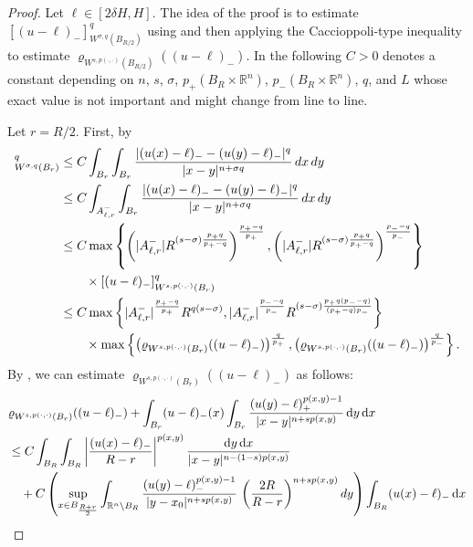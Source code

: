 \documentclass[11pt]{amsart}
\theoremstyle{plain}
\theoremstyle{definition}
\numberwithin{equation}{section}
\renewcommand{\d}{\textnormal{d}}
\newcommand{\R}{\mathbb{R}}
\begin{document}
\begin{proof}
Let $\ell\in[2\delta H,  H]$. The idea of the proof is to estimate $[(u-\ell)_{-}]_{W^{\sigma,q}(B_{R/2})}^q$ using 
and then applying the Caccioppoli-type inequality to estimate $\varrho_{W^{s,p(\cdot,\cdot)}(B_{R/2})}((u-\ell)_-) $. 
In the following $C>0$ denotes a constant depending on $n$, $s$, $\sigma$, $p_{+}(B_R\times\R^n)$, $p_{-}(B_R\times\R^n)$, $q$, and $L$ whose exact value is not important and might change from line to line.

Let $r=R/2$. First, by 
\begin{align*}
[(u-\ell)_{-}]_{W^{\sigma,q}(B_{r})}^q &\leq C\int_{B_{r}}\int_{B_{r}} \frac{|(u(x)-\ell)_{-} - (u(y)-\ell)_{-}|^q}{|x-y|^{n+\sigma q}} \, \d x\, \d y \\
& \leq C\int_{A_{\ell,r}^{-}}\int_{B_{r}} \frac{|(u(x)-\ell)_{-} - (u(y)-\ell)_{-}|^q}{|x-y|^{n+\sigma q}} \, \d x\, \d y \\
& \leq C \max \left\lbrace \left( |A_{\ell,r}^{-}| R^{(s-\sigma) \frac{p_+q }{p_+-q}} \right)^{\frac{p_+-q}{p_+}}, \left( |A_{\ell,r}^{-}| R^{(s-\sigma) \frac{p_+q }{p_+-q}} \right)^{\frac{p_--q}{p_-}} \right \rbrace \\
&\qquad \times [(u-\ell)_{-}]_{W^{s,p(\cdot, \cdot)}(B_{r})}^q \\
& \leq C \max \left\lbrace  |A_{\ell,r}^{-}|^{\frac{p_+-q}{p_+}} R^{q(s-\sigma)} ,  |A_{\ell,r}^{-}|^{\frac{p_--q}{p_-}} R^{(s-\sigma) \frac{p_+ q(p_--q)}{(p_+-q)p_-}} \right \rbrace \\
& \qquad \times \max\left\{ \left(\varrho_{W^{s,p(\cdot,\cdot)}(B_{r})}((u-\ell)_{-})\right)^{\frac{q}{p_{+}}}, \left(\varrho_{W^{s,p(\cdot,\cdot)}(B_{r})}((u-\ell)_{-})\right)^{\frac{q}{p_{-}}} \right\}.
\end{align*}
By , we can estimate $\varrho_{W^{s,p(\cdot,\cdot)}(B_{r})}((u-\ell)_-)$ as follows:
\begin{align*}
&\varrho_{W^{s,p(\cdot,\cdot)}(B_{r})}((u-\ell)_-) + \int_{B_r} (u-\ell)_-(x) \int_{B_r} \frac{(u(y)-\ell)_+^{p(x,y)-1}}{|x-y|^{n+sp(x,y)}} \,\mathrm{d}y \,\mathrm{d}x \\
&\leq C \int_{B_R} \int_{B_R} \left| \frac{(u(x)-\ell)_-}{R-r} \right|^{p(x,y)} \frac{\mathrm{d}y \,\mathrm{d}x}{|x-y|^{n-(1-s)p(x,y)}} \\
&\quad + C \left( \sup_{x \in B_{\frac{R+r}{2}}} \int_{\R^n \setminus B_R} \frac{(u(y)-\ell)_-^{p(x,y)-1}}{|y-x_0|^{n+sp(x,y)}} \,\left( \frac{2R}{R-r} \right)^{n+sp(x,y)} \d y \right)\int_{B_R} (u(x)-\ell)_- \,\mathrm{d}x \\

\end{align*}
\end{proof}
\end{document}
